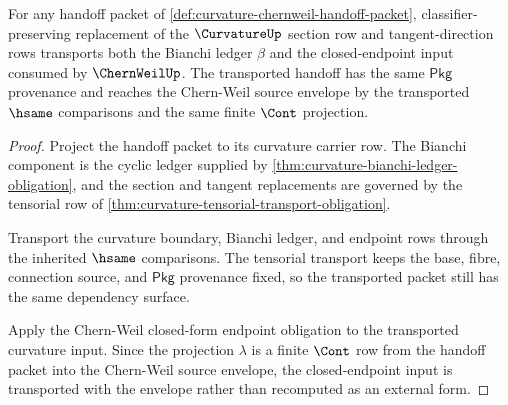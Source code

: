 \begin{theorem}
\label{thm:curvature-handoff-bianchi-transport}
For any handoff packet of \autoref{def:curvature-chernweil-handoff-packet}, classifier-preserving replacement of the $\CurvatureUp$ section row and tangent-direction rows transports both the Bianchi ledger $\beta$ and the closed-endpoint input consumed by $\ChernWeilUp$. The transported handoff has the same $\mathsf{Pkg}$ provenance and reaches the Chern-Weil source envelope by the transported $\hsame$ comparisons and the same finite $\Cont$ projection.
\end{theorem}
\begin{proof}
Project the handoff packet to its curvature carrier row. The Bianchi component is the cyclic ledger supplied by \autoref{thm:curvature-bianchi-ledger-obligation}, and the section and tangent replacements are governed by the tensorial row of \autoref{thm:curvature-tensorial-transport-obligation}.

Transport the curvature boundary, Bianchi ledger, and endpoint rows through the inherited $\hsame$ comparisons. The tensorial transport keeps the base, fibre, connection source, and $\mathsf{Pkg}$ provenance fixed, so the transported packet still has the same dependency surface.

Apply the Chern-Weil closed-form endpoint obligation to the transported curvature input. Since the projection $\lambda$ is a finite $\Cont$ row from the handoff packet into the Chern-Weil source envelope, the closed-endpoint input is transported with the envelope rather than recomputed as an external form.
\end{proof}

